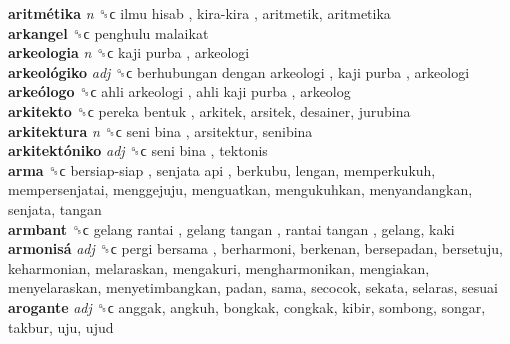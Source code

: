 \textbf{aritmétika} \emph{n}  ␝ϲ   ilmu hisab ,  kira-kira , aritmetik, aritmetika  \\
\textbf{arkangel} ␝ϲ   penghulu malaikat   \\
\textbf{arkeologia} \emph{n}  ␝ϲ   kaji purba , arkeologi  \\
\textbf{arkeológiko} \emph{adj}  ␝ϲ   berhubungan dengan arkeologi ,  kaji purba , arkeologi  \\
\textbf{arkeólogo} ␝ϲ   ahli arkeologi ,  ahli kaji purba , arkeolog  \\
\textbf{arkitekto} ␝ϲ   pereka bentuk , arkitek, arsitek, desainer, jurubina  \\
\textbf{arkitektura} \emph{n}  ␝ϲ   seni bina , arsitektur, senibina  \\
\textbf{arkitektóniko} \emph{adj}  ␝ϲ   seni bina , tektonis  \\
\textbf{arma} ␝ϲ   bersiap-siap ,  senjata api , berkubu, lengan, memperkukuh, mempersenjatai, menggejuju, menguatkan, mengukuhkan, menyandangkan, senjata, tangan  \\
\textbf{armbant} ␝ϲ   gelang rantai ,  gelang tangan ,  rantai tangan , gelang, kaki  \\
\textbf{armonisá} \emph{adj}  ␝ϲ   pergi bersama , berharmoni, berkenan, bersepadan, bersetuju, keharmonian, melaraskan, mengakuri, mengharmonikan, mengiakan, menyelaraskan, menyetimbangkan, padan, sama, secocok, sekata, selaras, sesuai  \\
\textbf{arogante} \emph{adj}  ␝ϲ  anggak, angkuh, bongkak, congkak, kibir, sombong, songar, takbur, uju, ujud  \\
